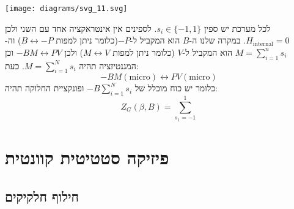 \documentclass{tstextbook}
\begin{document}
\texttt{[image: diagrams/svg\_11.svg]}
\begin{example}
לכל מערכת יש ספין \(s_{i}\in \{ -1,1 \}\). לספינים אין אינטראקציה אחד עם השני ולכן \(H_{\text{internal}}=0\). במקרה שלנו ה-\(B\) הוא המקביל ל-\(-P\)(כלומר ניתן למפות \(B\leftrightarrow -P\)) וה-\(M=\sum_{i=1}^{n}s_{i}\) הוא המקביל ל-\(V\) (כלומר ניתן למפות \(M\leftrightarrow V\)) ולכן \(-BM\leftrightarrow PV\) וכן המגנטיזציה תהיה \(M=\sum_{i=1}^{N}s_{i}\). כעת:
$$-BM(\text{micro})\leftrightarrow  PV(\text{micro})$$
כלומר יש כוח מוכלל של \(-B\sum_{i=1}^{N}s_{i}\) ופונקציית החלוקה תהיה:
$$Z_{G}\left( \beta,B \right)=\sum_{s_{1}=-1}^{1}$$

\end{example}
\chapter{פיזיקה סטטיטית קוונטית}

\section{חילוף חלקיקים}
\end{document}
